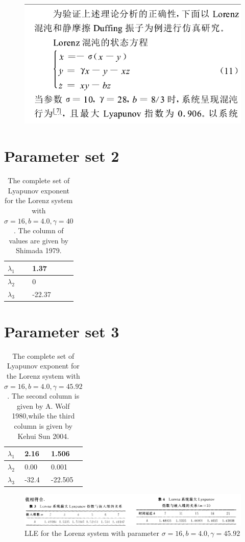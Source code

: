 \documentclass{article}
\begin{document}
	\begin{figure}[!hbp]
	\centering
	\includegraphics[width=1.2\linewidth]{./yang}
	\caption{}
	\label{fig:yang}
	\end{figure}

\section{Parameter set 2}
	\begin{table}[!hbp]
	\caption{The complete set of Lyapunov exponent for the Lorenz system with $\sigma=16,b=4.0,\gamma=40$. The column of values are given by Shimada 1979.}
		\begin{tabular}{|l|l|}
		\hline
			$\lambda_1$ & 1.37 \\
		\hline
			$\lambda_2$ & 0 \\
		\hline
			$\lambda_3$ & -22.37\\
		\hline
		\end{tabular}
	\end{table}
	
\section{Parameter set 3}
	\begin{table}[!h]
	\caption{The complete set of Lyapunov exponent for the Lorenz system with $\sigma=16,b=4.0,\gamma=45.92$. The second column is given by A. Wolf 1980,while the third column is given by Kehui Sun 2004.}
		\begin{tabular}{|l|l|l|}
		\hline
			$\lambda_1$ & 2.16 & 1.506 \\
		\hline
			$\lambda_2$ & 0.00 & 0.001 \\
		\hline
			$\lambda_3$ & -32.4 & -22.505\\
		\hline
		\end{tabular}
	\end{table}
	
	\begin{figure}
	\centering
	\includegraphics[width=1.2\linewidth]{./Li2003}
	\caption{LLE for the Lorenz system with parameter $\sigma=16,b=4.0,\gamma=45.92$}
	\label{fig:Li2003}
	\end{figure}
\end{document}
